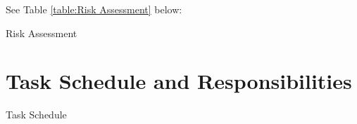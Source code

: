 \documentclass[11pt, oneside]{article} %
\begin{document}
See Table \ref{table:Risk Assessment} below:

\begin{table}
	\caption{Risk Assessment}
	\centering
	\label{table:Risk Assessment}
\end{table}


\section{Task Schedule and Responsibilities}

\begin{table}
	\caption{Task Schedule}
	\centering
	\label{table:Task Schedule}
\end{table}
\end{document}
